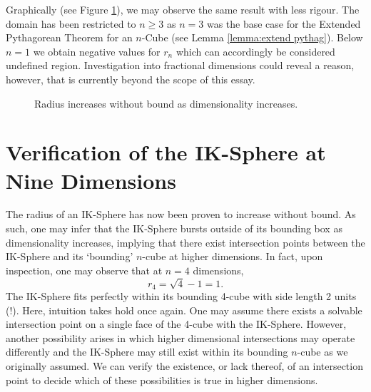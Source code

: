 Graphically (see Figure \ref{fig:radius increases graph}), we may observe the same result with less rigour. The domain has been restricted to $n\geq3$ as $n=3$ was the base case for the Extended Pythagorean Theorem for an $n$-Cube (see Lemma \ref{lemma:extend pythag}). Below $n=1$ we obtain negative values for $r_n$ which can accordingly be considered undefined region. Investigation into fractional dimensions could reveal a reason, however, that is currently beyond the scope of this essay.
\begin{figure}[H]
    \centering
    \caption{Radius increases without bound as dimensionality increases.}
    \label{fig:radius increases graph}
\end{figure}






\section{Verification of the IK-Sphere at Nine Dimensions}
The radius of an IK-Sphere has now been proven to increase without bound. As such, one may infer that the IK-Sphere bursts outside of its bounding box as dimensionality increases, implying that there exist intersection points between the IK-Sphere and its `bounding' $n$-cube at higher dimensions. In fact, upon inspection, one may observe that at $n=4$ dimensions, $$r_4=\sqrt{4}-1=1.$$ The IK-Sphere fits perfectly within its bounding 4-cube with side length 2 units (!). Here, intuition takes hold once again. One may assume there exists a solvable intersection point on a single face of the 4-cube with the IK-Sphere. However, another possibility arises in which higher dimensional intersections may operate differently and the IK-Sphere may still exist within its bounding $n$-cube as we originally assumed. We can verify the existence, or lack thereof, of an intersection point to decide which of these possibilities is true in higher dimensions.


